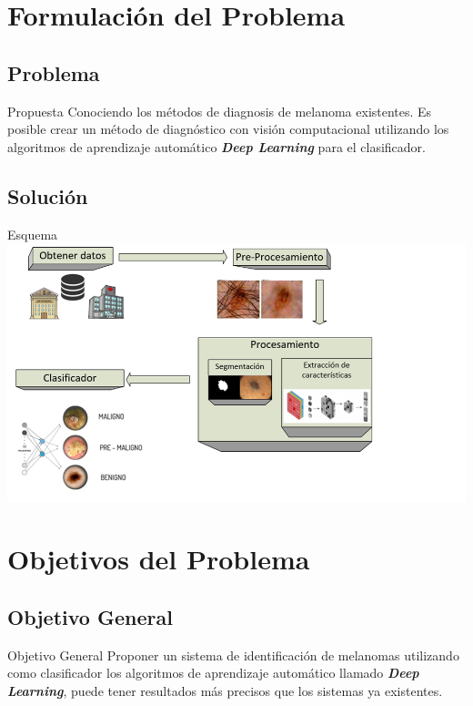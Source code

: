 \documentclass{beamer}
\begin{document}
%
\section{Formulación del Problema}
\subsection{Problema}
\begin{frame}{Propuesta}
Conociendo los métodos de diagnosis de melanoma existentes. Es posible crear un método de diagnóstico con visión computacional utilizando los algoritmos de aprendizaje automático \textbf{\textit{Deep Learning}} para el clasificador.
\end{frame}

\subsection{Solución}
\begin{frame}{Esquema}
\includegraphics[width=1.1\textwidth]{images/esquema_v01.png}
\end{frame}

\section{Objetivos del Problema}

\subsection{Objetivo General}

\begin{frame}{Objetivo General}
Proponer un sistema de identificación de melanomas utilizando como clasificador los algoritmos de aprendizaje automático llamado \textbf{\textit{Deep Learning}}, puede tener resultados más precisos que los sistemas ya existentes.
\end{frame}
\end{document}
